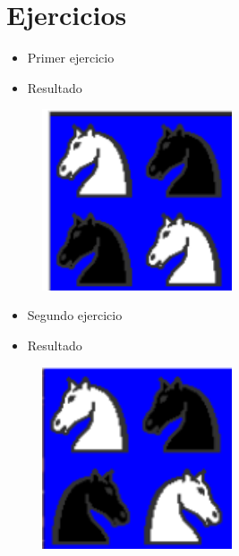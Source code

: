 \documentclass{article}
\begin{document}
\section{Ejercicios}
	\begin{itemize}
		\item Primer ejercicio
	\end{itemize}
	
	\begin{itemize}
		\item Resultado
	\end{itemize}
	\begin{figure}[H]
		\centering
		\includegraphics[width=0.5\textwidth,keepaspectratio]{img/Ejercicio2a.png}
	\end{figure}
	\begin{itemize}
		\item Segundo ejercicio
	\end{itemize}
	
	\begin{itemize}
		\item Resultado
	\end{itemize}
	\begin{figure}[H]
		\centering
		\includegraphics[width=0.5\textwidth,keepaspectratio]{img/Ejercicio2b.png}
	\end{figure}
\end{document}
